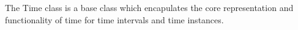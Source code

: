 
The Time class is a base class which encapulates the core representation and
functionality of time for time intervals and time instances.
